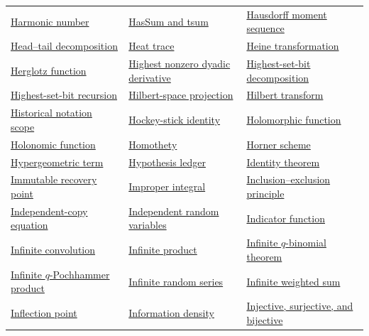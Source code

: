 \documentclass[11pt,oneside]{article}
\begin{document}
\begin{longtable}{L{0.31\textwidth}L{0.31\textwidth}L{0.31\textwidth}}
\hyperlink{gls:harmonic-number}{Harmonic number} & \hyperlink{gls:has-sum-and-tsum}{HasSum and tsum} & \hyperlink{gls:hausdorff-moment-sequence}{Hausdorff moment sequence} \\
\hyperlink{gls:head-tail-decomposition}{Head--tail decomposition} & \hyperlink{gls:heat-trace}{Heat trace} & \hyperlink{gls:heine-transformation}{Heine transformation} \\
\hyperlink{gls:herglotz-function}{Herglotz function} & \hyperlink{gls:highest-nonzero-derivative}{Highest nonzero dyadic derivative} & \hyperlink{gls:highest-set-bit-decomposition}{Highest-set-bit decomposition} \\
\hyperlink{gls:highest-set-bit-recursion}{Highest-set-bit recursion} & \hyperlink{gls:hilbert-space-projection}{Hilbert-space projection} & \hyperlink{gls:hilbert-transform}{Hilbert transform} \\
\hyperlink{gls:historical-notation-scope}{Historical notation scope} & \hyperlink{gls:hockey-stick-identity}{Hockey-stick identity} & \hyperlink{gls:holomorphic-function}{Holomorphic function} \\
\hyperlink{gls:holonomic-function}{Holonomic function} & \hyperlink{gls:homothety}{Homothety} & \hyperlink{gls:horner-scheme}{Horner scheme} \\
\hyperlink{gls:hypergeometric-term}{Hypergeometric term} & \hyperlink{gls:hypothesis-ledger}{Hypothesis ledger} & \hyperlink{gls:identity-theorem}{Identity theorem} \\
\hyperlink{gls:immutable-recovery-point}{Immutable recovery point} & \hyperlink{gls:improper-integral}{Improper integral} & \hyperlink{gls:inclusion-exclusion-principle}{Inclusion--exclusion principle} \\
\hyperlink{gls:independent-copy-equation}{Independent-copy equation} & \hyperlink{gls:independent-random-variables}{Independent random variables} & \hyperlink{gls:indicator-function}{Indicator function} \\
\hyperlink{gls:infinite-convolution}{Infinite convolution} & \hyperlink{gls:infinite-product}{Infinite product} & \hyperlink{gls:infinite-q-binomial-theorem}{Infinite \(q\)-binomial theorem} \\
\hyperlink{gls:infinite-q-pochhammer-product}{Infinite \(q\)-Pochhammer product} & \hyperlink{gls:infinite-random-series}{Infinite random series} & \hyperlink{gls:infinite-weighted-sum}{Infinite weighted sum} \\
\hyperlink{gls:inflection-point}{Inflection point} & \hyperlink{gls:information-density}{Information density} & \hyperlink{gls:injective-surjective-bijective}{Injective, surjective, and bijective} \\

\end{longtable}
\end{document}
